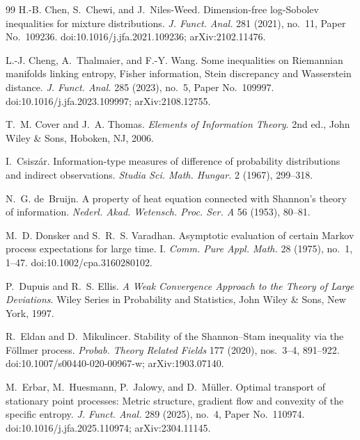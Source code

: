 \documentclass[11pt,reqno]{amsart}
\theoremstyle{plain}
\theoremstyle{definition}
\numberwithin{equation}{section}
\begin{document}
\begin{thebibliography}{99}
H.-B. Chen, S.~Chewi, and J.~Niles-Weed.
\newblock Dimension-free log-Sobolev inequalities for mixture distributions.
\newblock \emph{J. Funct. Anal.} 281 (2021), no.~11, Paper No.~109236.
\newblock doi:10.1016/j.jfa.2021.109236; arXiv:2102.11476.

L.-J. Cheng, A.~Thalmaier, and F.-Y. Wang.
\newblock Some inequalities on Riemannian manifolds linking entropy, Fisher
information, Stein discrepancy and Wasserstein distance.
\newblock \emph{J. Funct. Anal.} 285 (2023), no.~5, Paper No.~109997.
\newblock doi:10.1016/j.jfa.2023.109997; arXiv:2108.12755.

T.~M. Cover and J.~A. Thomas.
\newblock \emph{Elements of Information Theory}.
\newblock 2nd ed., John Wiley \& Sons, Hoboken, NJ, 2006.

I.~Csisz{\'a}r.
\newblock Information-type measures of difference of probability distributions
and indirect observations.
\newblock \emph{Studia Sci. Math. Hungar.} 2 (1967), 299--318.

N.~G. de~Bruijn.
\newblock A property of heat equation connected with Shannon's theory of
information.
\newblock \emph{Nederl. Akad. Wetensch. Proc. Ser. A} 56 (1953), 80--81.

M.~D. Donsker and S.~R.~S. Varadhan.
\newblock Asymptotic evaluation of certain {M}arkov process expectations for
large time. {I}.
\newblock \emph{Comm. Pure Appl. Math.} 28 (1975), no.~1, 1--47.
\newblock doi:10.1002/cpa.3160280102.

P.~Dupuis and R.~S. Ellis.
\newblock \emph{A Weak Convergence Approach to the Theory of Large
Deviations}.
\newblock Wiley Series in Probability and Statistics, John Wiley \& Sons,
New York, 1997.

R.~Eldan and D.~Mikulincer.
\newblock Stability of the Shannon--Stam inequality via the F{\"o}llmer
process.
\newblock \emph{Probab. Theory Related Fields} 177 (2020), nos.~3--4,
891--922.
\newblock doi:10.1007/s00440-020-00967-w; arXiv:1903.07140.

M.~Erbar, M.~Huesmann, P.~Jalowy, and D.~M{\"u}ller.
\newblock Optimal transport of stationary point processes: Metric structure,
gradient flow and convexity of the specific entropy.
\newblock \emph{J. Funct. Anal.} 289 (2025), no.~4, Paper No.~110974.
\newblock doi:10.1016/j.jfa.2025.110974; arXiv:2304.11145.


\end{thebibliography}
\end{document}
